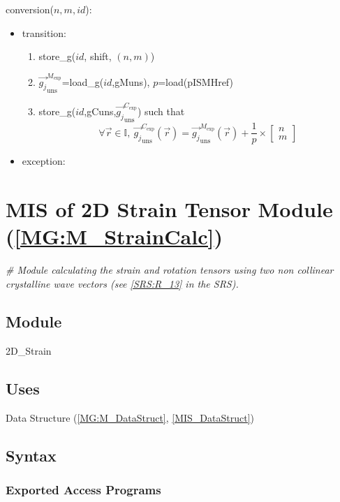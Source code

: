 \documentclass[12pt, titlepage]{article}
\begin{document}
\noindent conversion($n,m,id$):
\begin{itemize}
\item transition: 
	\begin{enumerate}
\item store{\_}g($id$, shift, $(n,m)$)
\item 
$\overrightarrow{g_{j}}_{\text{uns}}^{M_{\text{exp}}}$=load{\_}g($id$,gMuns), 
$p$=load(pISMHref)
\item 
store{\_}g($id$,gCuns,$\overrightarrow{g_{j}}_{\text{uns}}^{C_{\text{exp}}}$) 
such that
		\begin{equation*}
		\forall \vec{r} \in \mathbb{I}, \ 
\overrightarrow{g_{j}}_{\text{uns}}^{C_{\text{exp}}}(\vec{r})= 
\overrightarrow{g_{j}}_{\text{uns}}^{M_{\text{exp}}}(\vec{r}) + \frac{1}{p} 
\times \begin{bmatrix}
	n \\
	m
	\end{bmatrix}
		\end{equation*}
		\end{enumerate}
\item exception:
\end{itemize}

\section{MIS of 2D Strain Tensor Module (\texorpdfstring{\cref{MG:M_StrainCalc}}))} \label{MIS_StrainCalc}

\noindent\textit{{\#} Module calculating the strain and rotation tensors using 
two non collinear crystalline wave vectors (see \cref{SRS:R_13} in the SRS).}

\subsection{Module}
2D{\_}Strain
\subsection{Uses}
Data Structure (\cref{MG:M_DataStruct}, \cref{MIS_DataStruct})
\subsection{Syntax}

\subsubsection{Exported Access Programs}
\end{document}
